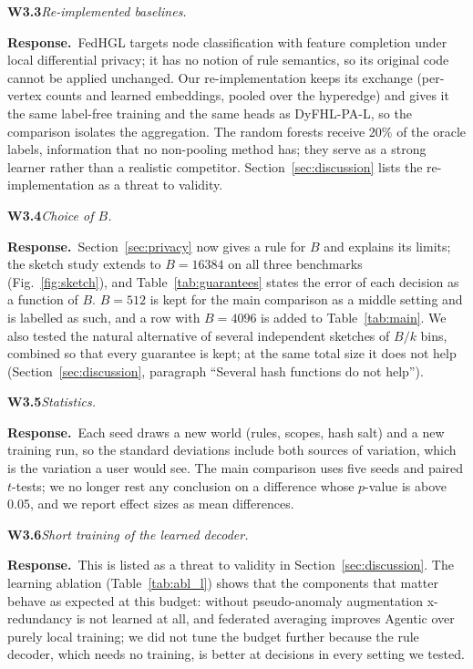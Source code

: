 \documentclass[11pt,a4paper]{article}
\newcommand{\name}{DyFHL-PA}
\newcommand{\concern}[2]{\medskip\noindent\textbf{#1}\quad\emph{#2}\par\smallskip}
\newcommand{\resp}{\noindent\textcolor{blue!55!black}{\textbf{Response.}}\ }
\begin{document}
\concern{W3.3}{Re-implemented baselines.}
\resp FedHGL targets node classification with feature completion under local differential privacy; it has no notion of rule semantics, so its original code cannot be applied unchanged. Our re-implementation keeps its exchange (per-vertex counts and learned embeddings, pooled over the hyperedge) and gives it the same label-free training and the same heads as \name-L, so the comparison isolates the aggregation. The random forests receive 20\% of the oracle labels, information that no non-pooling method has; they serve as a strong learner rather than a realistic competitor. Section~\ref{sec:discussion} lists the re-implementation as a threat to validity.

\concern{W3.4}{Choice of $B$.}
\resp Section~\ref{sec:privacy} now gives a rule for $B$ and explains its limits; the sketch study extends to $B=16384$ on all three benchmarks (Fig.~\ref{fig:sketch}), and Table~\ref{tab:guarantees} states the error of each decision as a function of $B$. $B=512$ is kept for the main comparison as a middle setting and is labelled as such, and a row with $B=4096$ is added to Table~\ref{tab:main}. We also tested the natural alternative of several independent sketches of $B/k$ bins, combined so that every guarantee is kept; at the same total size it does not help (Section~\ref{sec:discussion}, paragraph ``Several hash functions do not help'').

\concern{W3.5}{Statistics.}
\resp Each seed draws a new world (rules, scopes, hash salt) and a new training run, so the standard deviations include both sources of variation, which is the variation a user would see. The main comparison uses five seeds and paired $t$-tests; we no longer rest any conclusion on a difference whose $p$-value is above 0.05, and we report effect sizes as mean differences.

\concern{W3.6}{Short training of the learned decoder.}
\resp This is listed as a threat to validity in Section~\ref{sec:discussion}. The learning ablation (Table~\ref{tab:abl_l}) shows that the components that matter behave as expected at this budget: without pseudo-anomaly augmentation x-redundancy is not learned at all, and federated averaging improves Agentic over purely local training; we did not tune the budget further because the rule decoder, which needs no training, is better at decisions in every setting we tested.
\end{document}
